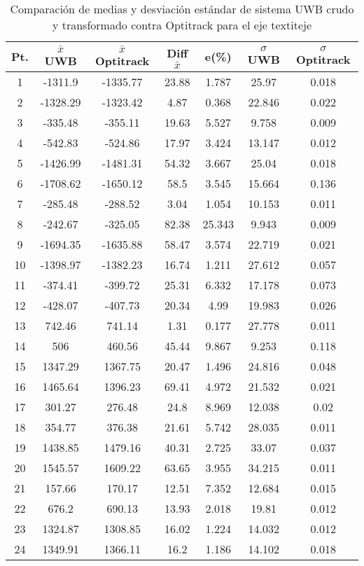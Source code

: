 \begin{table}[H]
\centering
\begin{tabular}{c c c c c c c }
\hline
Pt. & $\bar{x}$ UWB & $\bar{x}$ Optitrack & Diff $\bar{x}$ & e(\%) & $\sigma$ UWB & $\sigma$ Optitrack\\ \hline
1 & -1311.9 & -1335.77 & 23.88 & 1.787 & 25.97 & 0.018\\ 
2 & -1328.29 & -1323.42 & 4.87 & 0.368 & 22.846 & 0.022\\ 
3 & -335.48 & -355.11 & 19.63 & 5.527 & 9.758 & 0.009\\ 
4 & -542.83 & -524.86 & 17.97 & 3.424 & 13.147 & 0.012\\ 
5 & -1426.99 & -1481.31 & 54.32 & 3.667 & 25.04 & 0.018\\ 
6 & -1708.62 & -1650.12 & 58.5 & 3.545 & 15.664 & 0.136\\ 
7 & -285.48 & -288.52 & 3.04 & 1.054 & 10.153 & 0.011\\ 
8 & -242.67 & -325.05 & 82.38 & 25.343 & 9.943 & 0.009\\ 
9 & -1694.35 & -1635.88 & 58.47 & 3.574 & 22.719 & 0.021\\ 
10 & -1398.97 & -1382.23 & 16.74 & 1.211 & 27.612 & 0.057\\ 
11 & -374.41 & -399.72 & 25.31 & 6.332 & 17.178 & 0.073\\ 
12 & -428.07 & -407.73 & 20.34 & 4.99 & 19.983 & 0.026\\ 
13 & 742.46 & 741.14 & 1.31 & 0.177 & 27.778 & 0.011\\ 
14 & 506 & 460.56 & 45.44 & 9.867 & 9.253 & 0.118\\ 
15 & 1347.29 & 1367.75 & 20.47 & 1.496 & 24.816 & 0.048\\ 
16 & 1465.64 & 1396.23 & 69.41 & 4.972 & 21.532 & 0.021\\ 
17 & 301.27 & 276.48 & 24.8 & 8.969 & 12.038 & 0.02\\ 
18 & 354.77 & 376.38 & 21.61 & 5.742 & 28.035 & 0.011\\ 
19 & 1438.85 & 1479.16 & 40.31 & 2.725 & 33.07 & 0.037\\ 
20 & 1545.57 & 1609.22 & 63.65 & 3.955 & 34.215 & 0.011\\ 
21 & 157.66 & 170.17 & 12.51 & 7.352 & 12.684 & 0.015\\ 
22 & 676.2 & 690.13 & 13.93 & 2.018 & 19.81 & 0.012\\ 
23 & 1324.87 & 1308.85 & 16.02 & 1.224 & 14.032 & 0.012\\ 
24 & 1349.91 & 1366.11 & 16.2 & 1.186 & 14.102 & 0.018\\ 
\hline
\end{tabular}
\caption{Comparación de medias y desviación estándar de sistema UWB crudo y transformado contra Optitrack para el eje textit{eje}}
\end{table}

